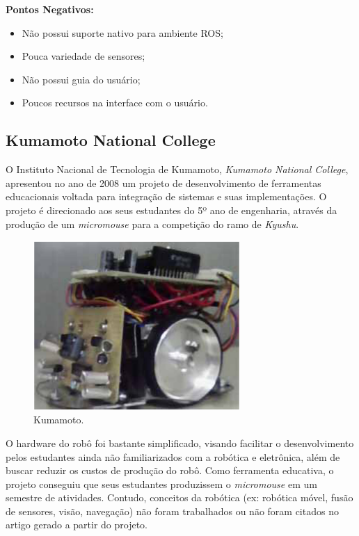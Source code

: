 \textbf{Pontos Negativos:}
\begin{itemize}
	\item Não possui suporte nativo para ambiente ROS;
	\item Pouca variedade de sensores;
	\item Não possui guia do usuário;
	\item Poucos recursos na interface com o usuário.
\end{itemize}


\subsection{Kumamoto National College}
\hspace{0.5cm} O Instituto Nacional de Tecnologia de Kumamoto, \textit{Kumamoto National College}, apresentou no ano de 2008 um projeto de desenvolvimento de ferramentas educacionais voltada para integração de sistemas e suas implementações. O projeto é direcionado aos seus estudantes do 5º ano de engenharia, através da produção de um \textit{micromouse} para a competição do ramo de \textit{Kyushu}.

\begin{figure}[H]
	\centering
	\includegraphics[width=0.7\textwidth]
	{Figures/Kumamoto_model.png}
	\caption{\label{fig:Kumamoto_model} Kumamoto.}
	\end{figure}

\hspace{0.5cm} O hardware do robô foi bastante simplificado, visando facilitar o desenvolvimento pelos estudantes ainda não familiarizados com a robótica e eletrônica, além de buscar reduzir os custos de produção do robô. Como ferramenta educativa, o projeto conseguiu que seus estudantes produzissem o \textit{micromouse} em um semestre de atividades. Contudo, conceitos da robótica (ex: robótica móvel, fusão de sensores, visão, navegação) não foram trabalhados ou não foram citados no artigo gerado a partir do projeto.


